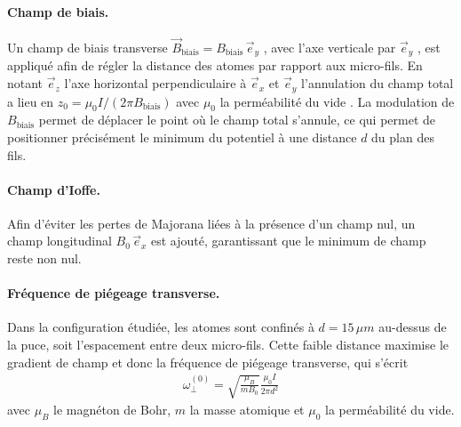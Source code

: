 \paragraph{Champ de biais.}
Un champ de biais transverse $\vec{B}_{\mathrm{biais}} = {B}_{\mathrm{biais}} \, \vec{e}_y$ , avec l'axe verticale par $\vec{e}_y$ , est appliqué afin de régler la distance des atomes par rapport aux micro-fils. En notant $\vec{e}_z$ l’axe horizontal perpendiculaire à $\vec{e}_x$ et $\vec{e}_y$ l’annulation du champ total a lieu en
$z_0 = \mu_0 I / (2 \pi {B}_{\mathrm{biais}} ) $ avec $\mu_0$ la perméabilité du vide . La modulation de ${B}_{\mathrm{biais}}$ permet de déplacer le point où le champ total s’annule, ce qui permet de positionner précisément le minimum du potentiel à une distance $d$ du plan des fils. 

\paragraph{Champ d’Ioffe.}
Afin d’éviter les pertes de Majorana liées à la présence d’un champ nul, un champ longitudinal $B_0 \, \vec{e}_x$ est ajouté, garantissant que le minimum de champ reste non nul.%


\paragraph{Fréquence de piégeage transverse.}
Dans la configuration étudiée, les atomes sont confinés à $ d = 15\, \mu m$ au-dessus de la puce, soit l’espacement entre deux micro-fils. Cette faible distance maximise le gradient de champ et donc la fréquence de piégeage transverse, qui s’écrit
\begin{eqnarray*}
	\omega_\perp^{(0)} =  \sqrt{\frac{\mu_B}{mB_0}} \frac{\mu_0 I }{2\pi d^2} 
\end{eqnarray*}
avec $\mu_B$ le magnéton de Bohr, $m$ la masse atomique et $\mu_0$ la perméabilité du vide.

